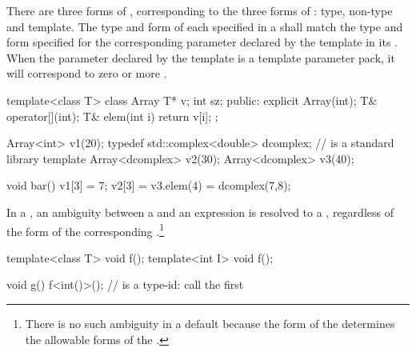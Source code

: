 \pnum
{}%
There are three forms of
,
corresponding to the three forms of
:
type, non-type and template.
The type and form of each
specified in a
shall match the type and form specified for the corresponding
parameter declared by the template in its
.
When the parameter declared by the template is a template
parameter pack, it will correspond to zero or more
.
\begin{example}
\begin{codeblock}
template<class T> class Array {
  T* v;
  int sz;
public:
  explicit Array(int);
  T& operator[](int);
  T& elem(int i) { return v[i]; }
};

Array<int> v1(20);
typedef std::complex<double> dcomplex;  //  is a standard library template
Array<dcomplex> v2(30);
Array<dcomplex> v3(40);

void bar() {
  v1[3] = 7;
  v2[3] = v3.elem(4) = dcomplex(7,8);
}
\end{codeblock}
\end{example}

\pnum
In a
,
an ambiguity between a
and an expression is resolved to a
,
regardless of the form of the corresponding
.\footnote{There is no such ambiguity in a default
because the form of the
determines the allowable forms of the
.}
\begin{example}
\begin{codeblock}
template<class T> void f();
template<int I> void f();

void g() {
  f<int()>();       //  is a type-id: call the first 
}
\end{codeblock}
\end{example}

